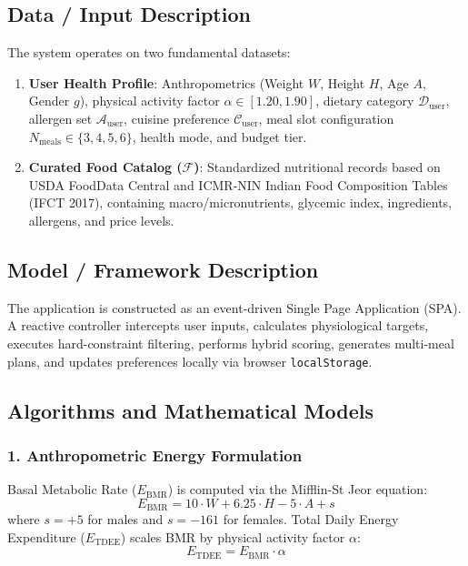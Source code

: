 \documentclass[12pt,a4paper]{report}
\begin{document}
\subsection{Data / Input Description}
The system operates on two fundamental datasets:
\begin{enumerate}
    \item \textbf{User Health Profile}: Anthropometrics (Weight $W$, Height $H$, Age $A$, Gender $g$), physical activity factor $\alpha \in [1.20, 1.90]$, dietary category $\mathcal{D}_{\text{user}}$, allergen set $\mathcal{A}_{\text{user}}$, cuisine preference $\mathcal{C}_{\text{user}}$, meal slot configuration $N_{\text{meals}} \in \{3, 4, 5, 6\}$, health mode, and budget tier.
    \item \textbf{Curated Food Catalog ($\mathcal{F}$)}: Standardized nutritional records based on USDA FoodData Central and ICMR-NIN Indian Food Composition Tables (IFCT 2017), containing macro/micronutrients, glycemic index, ingredients, allergens, and price levels.
\end{enumerate}

\subsection{Model / Framework Description}
The application is constructed as an event-driven Single Page Application (SPA). A reactive controller intercepts user inputs, calculates physiological targets, executes hard-constraint filtering, performs hybrid scoring, generates multi-meal plans, and updates preferences locally via browser \texttt{localStorage}.

\subsection{Algorithms and Mathematical Models}

\subsubsection{1. Anthropometric Energy Formulation}
Basal Metabolic Rate ($E_{\text{BMR}}$) is computed via the Mifflin-St Jeor equation:
\begin{equation}
E_{\text{BMR}} = 10 \cdot W + 6.25 \cdot H - 5 \cdot A + s
\end{equation}
where $s = +5$ for males and $s = -161$ for females. Total Daily Energy Expenditure ($E_{\text{TDEE}}$) scales BMR by physical activity factor $\alpha$:
\begin{equation}
E_{\text{TDEE}} = E_{\text{BMR}} \cdot \alpha
\end{equation}
\end{document}
